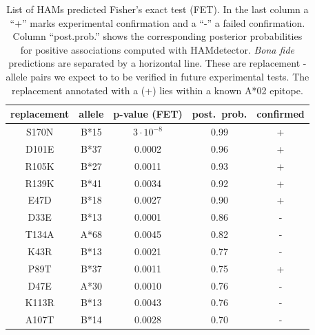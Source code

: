 \documentclass{bioinfo}
\begin{document}
\begin{table}
  \caption{List of HAMs predicted Fisher's exact test (FET). In the last column a ``+'' marks experimental confirmation and a ``-'' a failed confirmation. Column ``post.prob.'' shows the corresponding posterior probabilities for positive associations computed with HAMdetector. \emph{Bona fide} predictions are separated by a horizontal line. These are replacement - allele pairs we expect to to be verified in future experimental tests. The replacement annotated with a (+) lies within a known A*02 epitope.}
  \begin{tabular}{c|c|c|c|c}
  replacement & allele  & p-value (FET) & post.~prob. & confirmed \\
  \hline
  S170N       & B*15 & $3\cdot10^{-8}$      & 0.99                                & +                        \\
  D101E       & B*37 & 0.0002                        & 0.96                                & +                        \\
  R105K       & B*27 & 0.0011                        & 0.93                                & +                        \\
  R139K       & B*41 & 0.0034                        & 0.92                                & +                        \\
  E47D        & B*18 & 0.0027                        & 0.90                                & +                        \\
  D33E        & B*13 & 0.0001                        & 0.86                                & -                        \\
  T134A       & A*68 & 0.0045                        & 0.82                                & -                        \\
  K43R        & B*13 & 0.0021                        & 0.77                                & -                        \\
  P89T        & B*37 & 0.0011                        & 0.75                                & +                        \\
  D47E        & A*30 & 0.0010                        & 0.76                                & -                        \\
  K113R       & B*13 & 0.0043                        & 0.76                                & -                        \\
  A107T       & B*14 & 0.0028                        & 0.70                                & -                        \\

\end{tabular}
\end{table}
\end{document}
